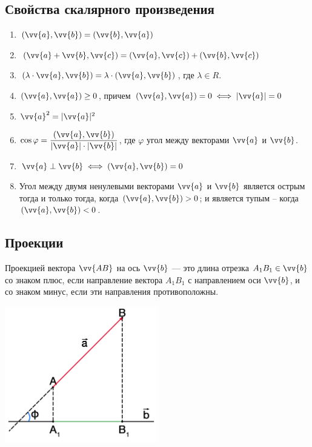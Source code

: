 \documentclass[a4paper,12pt,oneside]{extbook}
\theoremstyle{numbered}
\theoremstyle{unnumbered}
\theoremstyle{named}
\theoremstyle{unnumbered}
\theoremstyle{named}
\theoremstyle{named}
\theoremstyle{named}
\begin{document}
\subsection{Свойства скалярного произведения}

\begin{enumerate}
    \item \((\vv{a}, \vv{b}) = (\vv{b}, \vv{a})\)

    \item \((\vv{a} + \vv{b}, \vv{c}) = (\vv{a}, \vv{c}) + (\vv{b}, \vv{c})\)

    \item \((\lambda \cdot \vv{a}, \vv{b}) = \lambda \cdot (\vv{a}, \vv{b})\), где \(\lambda \in R\).

    \item \((\vv{a}, \vv{a}) \geq 0\), причем \((\vv{a}, \vv{a}) = 0 \iff |\vv{a}| = 0\)

    \item \(\vv{a}^2 = |\vv{a}|^2\)

    \item \(\cos{\varphi} = \dfrac{(\vv{a}, \vv{b})}{|\vv{a}| \cdot |\vv{b}|}\), где \(\varphi\) угол между векторами \(\vv{a}\) и \(\vv{b}\).

    \item \(\vv{a} \perp \vv{b} \iff (\vv{a}, \vv{b}) = 0\)

    \item Угол между двумя ненулевыми векторами \(\vv{a}\) и \(\vv{b}\) является острым тогда и только тогда, когда \((\vv{a}, \vv{b}) > 0\); и является тупым – когда \((\vv{a}, \vv{b}) < 0\).
\end{enumerate}

\subsection{Проекции}

Проекцией вектора \(\vv{AB}\) на ось \(\vv{b}\) — это длина отрезка \(A_1B_1 \in \vv{b}\) со знаком плюс, если направление вектора \(A_1B_1\) с направлением оси \(\vv{b}\), и со знаком минус, если эти направления противоположны.

\begin{center}
    \includegraphics[width=0.5\textwidth]{projection.png}
\end{center}
\end{document}
